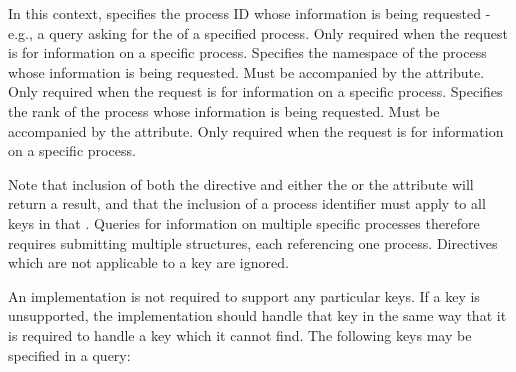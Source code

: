 In this context, specifies the process ID whose information is being requested - e.g., a query asking for the  of a specified process. Only required when the request is for information on a specific process.
\pasteAttributeItemEnd
{}Specifies the namespace of the process whose information is being requested. Must be accompanied by the  attribute. Only required when the request is for information on a specific process.
\pasteAttributeItemEnd
{}Specifies the rank of the process whose information is being requested. Must be accompanied by the  attribute. Only required when the request is for information on a specific process.
\pasteAttributeItemEnd
{}

Note that inclusion of both the  directive and either the  or the  attribute will return a  result, and that the inclusion of a process identifier must apply to all keys in that . Queries for information on multiple specific processes therefore requires submitting multiple  structures, each referencing one process.  Directives which are not applicable to a key are ignored.

\reqattrend

An implementation is not required to support any particular keys.  If a key is unsupported, the implementation should handle that key in the same way that it is required to handle a key which it cannot find.
The following keys may be specified in a query:

